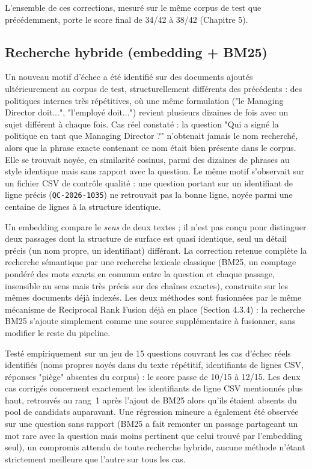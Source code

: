 \documentclass[12pt,a4paper]{report}
\begin{document}
L'ensemble de ces corrections, mesuré sur le même corpus de test que
précédemment, porte le score final de 34/42 à 38/42 (Chapitre 5).

\subsection{Recherche hybride (embedding + BM25)}

Un nouveau motif d'échec a été identifié sur des documents ajoutés
ultérieurement au corpus de test, structurellement différents des
précédents : des politiques internes très répétitives, où une même
formulation ("le Managing Director doit...", "l'employé doit...") revient
plusieurs dizaines de fois avec un sujet différent à chaque fois. Cas
réel constaté : la question "Qui a signé la politique en tant que
Managing Director ?" n'obtenait jamais le nom recherché, alors que la
phrase exacte contenant ce nom était bien présente dans le corpus. Elle
se trouvait noyée, en similarité cosinus, parmi des dizaines de phrases
au style identique mais sans rapport avec la question. Le même motif
s'observait sur un fichier CSV de contrôle qualité : une question portant
sur un identifiant de ligne précis (\texttt{QC-2026-1035}) ne retrouvait
pas la bonne ligne, noyée parmi une centaine de lignes à la structure
identique.

Un embedding compare le \emph{sens} de deux textes ; il n'est pas conçu
pour distinguer deux passages dont la structure de surface est quasi
identique, seul un détail précis (un nom propre, un identifiant)
différant. La correction retenue complète la recherche sémantique par
une recherche lexicale classique (BM25, un comptage pondéré des mots
exacts en commun entre la question et chaque passage, insensible au
sens mais très précis sur des chaînes exactes), construite sur les
mêmes documents déjà indexés. Les deux méthodes sont fusionnées par le
même mécanisme de Reciprocal Rank Fusion déjà en place (Section
4.3.4) : la recherche BM25 s'ajoute simplement comme une source
supplémentaire à fusionner, sans modifier le reste du pipeline.

Testé empiriquement sur un jeu de 15 questions couvrant les cas d'échec
réels identifiés (noms propres noyés dans du texte répétitif,
identifiants de lignes CSV, réponses "piège" absentes du corpus) : le
score passe de 10/15 à 12/15. Les deux cas corrigés concernent
exactement les identifiants de ligne CSV mentionnés plus haut, retrouvés
au rang~1 après l'ajout de BM25 alors qu'ils étaient absents du pool de
candidats auparavant. Une régression mineure a également été observée
sur une question sans rapport (BM25 a fait remonter un passage partageant
un mot rare avec la question mais moins pertinent que celui trouvé par
l'embedding seul), un compromis attendu de toute recherche hybride,
aucune méthode n'étant strictement meilleure que l'autre sur tous les
cas.
\end{document}
